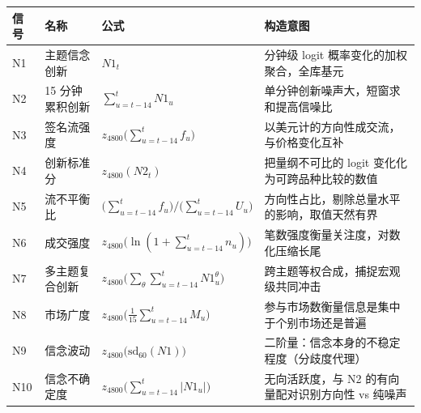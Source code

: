 \setlength{\tabcolsep}{4pt}
\begin{tabular}{llp{6.4cm}p{4.5cm}}
\toprule
信号 & 名称 & 公式 & 构造意图 \\
\midrule
N1 & 主题信念创新 & $\displaystyle N1_t$ & 分钟级 logit 概率变化的加权聚合，全库基元 \\
N2 & 15 分钟累积创新 & $\displaystyle \sum_{u=t-14}^{t} N1_u$ & 单分钟创新噪声大，短窗求和提高信噪比 \\
N3 & 签名流强度 & $\displaystyle z_{4800}\!\Big(\sum_{u=t-14}^{t} f_u\Big)$ & 以美元计的方向性成交流，与价格变化互补 \\
N4 & 创新标准分 & $\displaystyle z_{4800}(N2_t)$ & 把量纲不可比的 logit 变化化为可跨品种比较的数值 \\
N5 & 流不平衡比 & $\displaystyle \Big(\sum_{u=t-14}^{t} f_u\Big)\Big/\Big(\sum_{u=t-14}^{t} U_u\Big)$ & 方向性占比，剔除总量水平的影响，取值天然有界 \\
N6 & 成交强度 & $\displaystyle z_{4800}\!\big(\ln(1+\textstyle\sum_{u=t-14}^{t} n_u)\big)$ & 笔数强度衡量关注度，对数化压缩长尾 \\
N7 & 多主题复合创新 & $\displaystyle z_{4800}\!\Big(\sum_{\theta}\sum_{u=t-14}^{t} N1^{\theta}_u\Big)$ & 跨主题等权合成，捕捉宏观级共同冲击 \\
N8 & 市场广度 & $\displaystyle z_{4800}\!\Big(\tfrac{1}{15}\sum_{u=t-14}^{t} M_u\Big)$ & 参与市场数衡量信息是集中于个别市场还是普遍 \\
N9 & 信念波动 & $\displaystyle z_{4800}\!\big(\mathrm{sd}_{60}(N1)\big)$ & 二阶量：信念本身的不稳定程度（分歧度代理） \\
N10 & 信念不确定度 & $\displaystyle z_{4800}\!\Big(\sum_{u=t-14}^{t} |N1_u|\Big)$ & 无向活跃度，与 N2 的有向量配对识别方向性 vs 纯噪声 \\
\bottomrule
\end{tabular}

